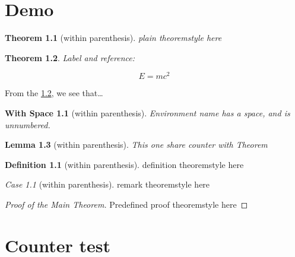 \theoremstyle{plain}
\newtheorem{Theorem}{Theorem}[section]
\newtheorem{Lemma}[Theorem]{Lemma}
\newtheorem{Corollary}[Theorem]{Corollary}
\newtheorem*{With Space}{With Space}
\newtheorem{Proposition}{Proposition}[section]
\newtheorem{Conjecture}[Proposition]{Conjecture}
\newtheorem{WithoutSpace}{WithoutSpace}[section]
\theoremstyle{definition}
\newtheorem{Definition}{Definition}[section]
\theoremstyle{remark}
\newtheorem{Case}{Case}[section]

\hypertarget{demo}{%
\chapter{Demo}\label{demo}}

\begin{Theorem}[within parenthesis]
plain theoremstyle \emph{here}
\end{Theorem}

\begin{Theorem}\label{simplestEquation}
\leavevmode{}%
Label and reference:

\[E=mc^2\]
\end{Theorem}

From the \ref{simplestEquation}, we see that\ldots{}

\begin{With Space}[within parenthesis]
Environment name has a space, and is unnumbered.
\end{With Space}

\begin{Lemma}[within parenthesis]
This one share counter with Theorem
\end{Lemma}

\begin{Definition}[within parenthesis]
definition theoremstyle here
\end{Definition}

\begin{Case}[within parenthesis]
remark theoremstyle here
\end{Case}

\begin{proof}[Proof of the Main Theorem]
Predefined proof theoremstyle here
\end{proof}

\hypertarget{counter-test}{%
\chapter{Counter test}\label{counter-test}}

